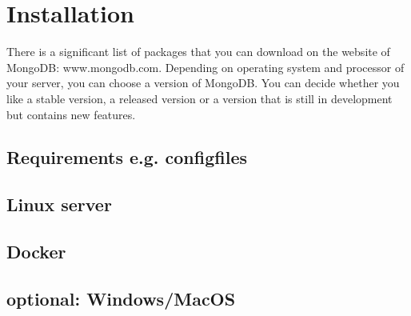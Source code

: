 
\section{Installation}
There is a significant list of packages that you can download on the website of MongoDB: www.mongodb.com. Depending on operating system and processor of your server, you can choose a version of MongoDB. 
You can decide whether you like a stable version, a released version or a version that is still in development but contains new features. \parencite{Membrey2014}

\subsection{Requirements e.g. configfiles}

\subsection{Linux server}

\subsection{Docker}

\subsection{optional: Windows/MacOS}